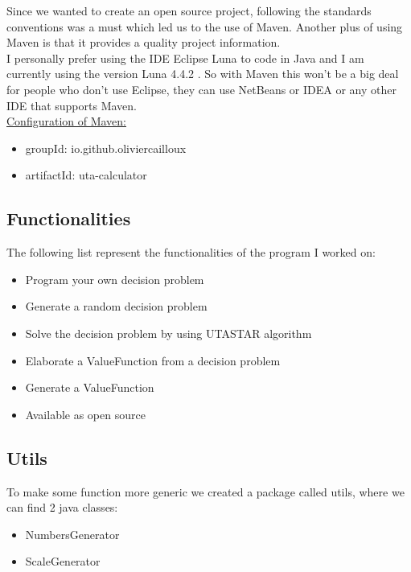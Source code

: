 \documentclass{report}
\begin{document}
Since we wanted to create an open source project, following the standards conventions was a must which led us to the use of Maven. Another plus of using Maven is that it provides a quality project information. \\

I personally prefer using the IDE Eclipse Luna to code in Java and I am currently using the version Luna 4.4.2 . So with Maven this won't be a big deal for people who don't use Eclipse, they can use NetBeans or IDEA or any other IDE that supports Maven.  \\

\underline{Configuration of Maven: }
\begin{itemize}
\item groupId: io.github.oliviercailloux
\item artifactId: uta-calculator
\end{itemize}

\subsection{Functionalities}
The following list represent the functionalities of the program I worked on:
\begin{itemize}
\item Program your own decision problem
\item Generate a random decision problem
\item Solve the decision problem by using UTASTAR algorithm
\item Elaborate a ValueFunction from a decision problem
\item Generate a ValueFunction
\item Available as open source
\end{itemize}
 
\subsection{Utils}
To make some function  more generic we created a package called utils, where we can find 2 java classes: 
\begin{itemize}
\item NumbersGenerator
\item ScaleGenerator
\end{itemize}
\end{document}
